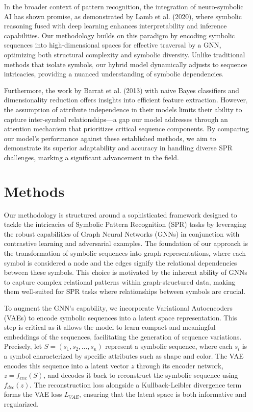 \documentclass{article}
\begin{document}
In the broader context of pattern recognition, the integration of neuro-symbolic AI has shown promise, as demonstrated by Lamb et al. (2020), where symbolic reasoning fused with deep learning enhances interpretability and inference capabilities. Our methodology builds on this paradigm by encoding symbolic sequences into high-dimensional spaces for effective traversal by a GNN, optimizing both structural complexity and symbolic diversity. Unlike traditional methods that isolate symbols, our hybrid model dynamically adjusts to sequence intricacies, providing a nuanced understanding of symbolic dependencies.

Furthermore, the work by Barrat et al. (2013) with naive Bayes classifiers and dimensionality reduction offers insights into efficient feature extraction. However, the assumption of attribute independence in their models limits their ability to capture inter-symbol relationships—a gap our model addresses through an attention mechanism that prioritizes critical sequence components. By comparing our model's performance against these established methods, we aim to demonstrate its superior adaptability and accuracy in handling diverse SPR challenges, marking a significant advancement in the field.

\section{Methods}
Our methodology is structured around a sophisticated framework designed to tackle the intricacies of Symbolic Pattern Recognition (SPR) tasks by leveraging the robust capabilities of Graph Neural Networks (GNNs) in conjunction with contrastive learning and adversarial examples. The foundation of our approach is the transformation of symbolic sequences into graph representations, where each symbol is considered a node and the edges signify the relational dependencies between these symbols. This choice is motivated by the inherent ability of GNNs to capture complex relational patterns within graph-structured data, making them well-suited for SPR tasks where relationships between symbols are crucial.

To augment the GNN’s capability, we incorporate Variational Autoencoders (VAEs) to encode symbolic sequences into a latent space representation. This step is critical as it allows the model to learn compact and meaningful embeddings of the sequences, facilitating the generation of sequence variations. Precisely, let \( S = (s_1, s_2, \dots, s_n) \) represent a symbolic sequence, where each \( s_i \) is a symbol characterized by specific attributes such as shape and color. The VAE encodes this sequence into a latent vector \( z \) through its encoder network, \( z = f_{enc}(S) \), and decodes it back to reconstruct the symbolic sequence using \( f_{dec}(z) \). The reconstruction loss alongside a Kullback-Leibler divergence term forms the VAE loss \( L_{VAE} \), ensuring that the latent space is both informative and regularized.
\end{document}
